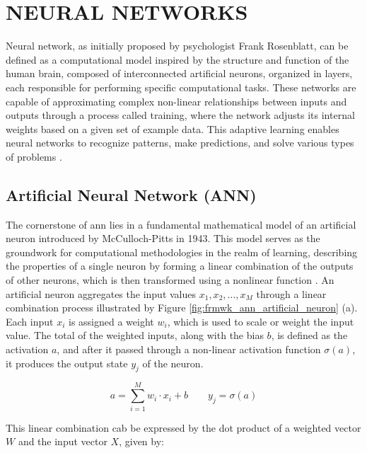 \section{NEURAL NETWORKS}
\label{sec:frmwk_neural_networks}

 Neural network, as initially proposed by psychologist Frank Rosenblatt, can be defined as a computational model inspired by the structure and function of the human brain, composed of interconnected artificial neurons, organized in layers, each responsible for performing specific computational tasks. These networks are capable of approximating complex non-linear relationships between inputs and outputs through a process called training, where the network adjusts its internal weights based on a given set of example data. This adaptive learning enables neural networks to recognize patterns, make predictions, and solve various types of problems \cite{Rosenblatt1958}.
 

\subsection{Artificial Neural Network (ANN)}
\label{subsec:neural_network_ANN}

The cornerstone of \gls{ann} lies in a fundamental mathematical model of an artificial neuron introduced by McCulloch-Pitts in 1943. This model serves as the groundwork for computational methodologies in the realm of learning, describing the properties of a single neuron by forming a linear combination of the outputs of other neurons, which is then transformed using a nonlinear function \cite{Bishop2023}. An artificial neuron aggregates the input values {$x_1, x_2, \ldots , x_M$} through a linear combination process illustrated by Figure \ref{fig:frmwk_ann_artificial_neuron} (a). Each input $x_i$ is assigned a weight $w_i$, which is used to scale or weight the input value. The total of the weighted inputs, along with the bias $b$, is defined as the activation $a$, and after it passed through a non-linear activation function $\sigma(a)$, it produces the output state $y_j$ of the neuron. 

\begin{equation}
    \label{eq:ann_activation}
    a = \sum_{i=1}^M w_i \cdot x_i + b \quad\quad y_j = \sigma(a)
\end{equation}

This linear combination cab be expressed by the dot product of a weighted vector $W$ and the input vector $X$, given by:

